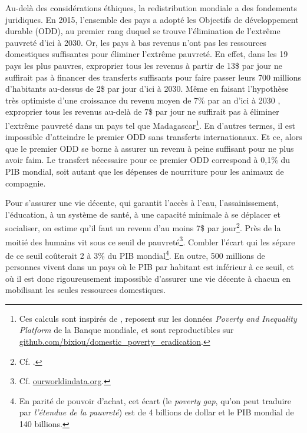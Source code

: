 \documentclass[a5paper,french]{memoir}
\begin{document}
Au-delà des considérations éthiques, la redistribution mondiale a des fondements juridiques. En 2015, l'ensemble des pays a adopté les Objectifs de développement durable (ODD), au premier rang duquel se trouve l'élimination de l'extrême pauvreté d'ici à 2030. Or, les pays à bas revenus n'ont pas les ressources domestiques suffisantes pour éliminer l'extrême pauvreté. En effet,  dans les 19 pays les plus pauvres, exproprier tous les revenus à partir de 13\$ par jour ne suffirait pas à financer des transferts suffisants pour faire passer leurs 700 millions d'habitants au-dessus de 2\$ par jour d'ici à 2030. Même en faisant l'hypothèse très optimiste d'une croissance du revenu moyen de 7\% par an d'ici à 2030%
, exproprier tous les revenus au-delà de 7\$ par jour ne suffirait pas à éliminer l'extrême pauvreté dans un pays tel que Madagascar\footnote{Ces calculs sont inspirés de \citet{bolch_arithmetics_2022}, reposent sur les données \textit{Poverty and Inequality Platform} de la Banque mondiale, et sont reproductibles sur \href{https://github.com/bixiou/domestic\_poverty\_eradication/code\_poverty/main.R}{github.com/bixiou/domestic\_poverty\_eradication}.}. En d'autres termes, il est impossible d'atteindre le premier ODD sans transferts internationaux. Et ce, alors que le premier ODD se borne à assurer un revenu à peine suffisant pour ne plus avoir faim. Le transfert nécessaire pour ce premier ODD correspond à 0,1\% du PIB mondial, soit autant que les dépenses de nourriture pour les animaux de compagnie. %

Pour s'assurer une vie décente, qui garantit l'accès à l'eau, l'assainissement, l'éducation, à un système de santé, à une capacité minimale à se déplacer et socialiser, on estime qu'il faut un revenu d'au moins 7\$ par jour\footnote{Cf. \citet{kikstra_decent_2021}.}. Près de la moitié des humains vit sous ce seuil de pauvreté\footnote{Cf. \href{https://ourworldindata.org/grapher/distribution-of-population-between-different-poverty-thresholds-up-to-30-dollars}{ourworldindata.org}.}. Combler l'écart qui les sépare de ce seuil coûterait 2 à 3\% du PIB mondial\footnote{En parité de pouvoir d'achat, cet écart (le \textit{poverty gap}, qu'on peut traduire par \textit{l'étendue de la pauvreté}) est de 4 billions de dollar et le PIB mondial de 140 billions.}. %
En outre, 500 millions de personnes vivent dans un pays où le PIB par habitant est inférieur à ce seuil, et où il est donc rigoureusement impossible d'assurer une vie décente à chacun en mobilisant les seules ressources domestiques. 
\end{document}

